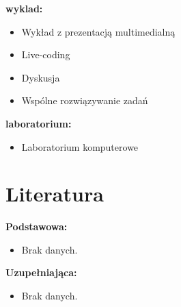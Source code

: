 \documentclass[12pt, a4paper]{article}
\begin{document}
\textbf{wyklad:}
\begin{itemize}
  \item Wykład z prezentacją multimedialną
  \item Live-coding
  \item Dyskusja
  \item Wspólne rozwiązywanie zadań
\end{itemize}
\vspace{4pt}
\textbf{laboratorium:}
\begin{itemize}
  \item Laboratorium komputerowe
\end{itemize}
\vspace{4pt}


\section{Literatura}

\textbf{Podstawowa:}
\begin{itemize}
  \item Brak danych.
\end{itemize}

\textbf{Uzupełniająca:}
\begin{itemize}
  \item Brak danych.
\end{itemize}
\end{document}
